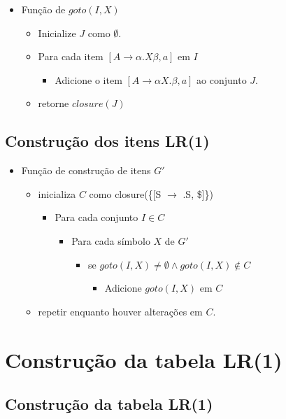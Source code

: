 \documentclass[11pt]{article}
\begin{document}
\begin{itemize}
\item Função de \(goto(I,X)\)
\begin{itemize}
\item Inicialize \(J\) como \(\emptyset\).
\item Para cada item \([A\to \alpha .X \beta,a]\) em \(I\)
\begin{itemize}
\item Adicione o item \([A \to \alpha X. \beta, a]\) ao conjunto \(J\).
\end{itemize}
\item retorne \(closure(J)\)
\end{itemize}
\end{itemize}
\subsection*{Construção dos itens LR(1)}
\label{sec:orga59a8a3}

\begin{itemize}
\item Função de construção de itens \(G'\)
\begin{itemize}
\item inicializa \(C\) como closure(\{[S \(\to\) .S, \$]\})
\begin{itemize}
\item Para cada conjunto \(I \in C\)
\begin{itemize}
\item Para cada símbolo \(X\) de \(G'\)
\begin{itemize}
\item se \(goto(I,X) \neq \emptyset \land goto(I,X) \not\in C\)
\begin{itemize}
\item Adicione \(goto(I,X)\) em \(C\)
\end{itemize}
\end{itemize}
\end{itemize}
\end{itemize}
\item repetir enquanto houver alterações em \(C\).
\end{itemize}
\end{itemize}
\section*{Construção da tabela LR(1)}
\label{sec:org909a881}

\subsection*{Construção da tabela LR(1)}
\label{sec:org998ffa4}
\end{document}

